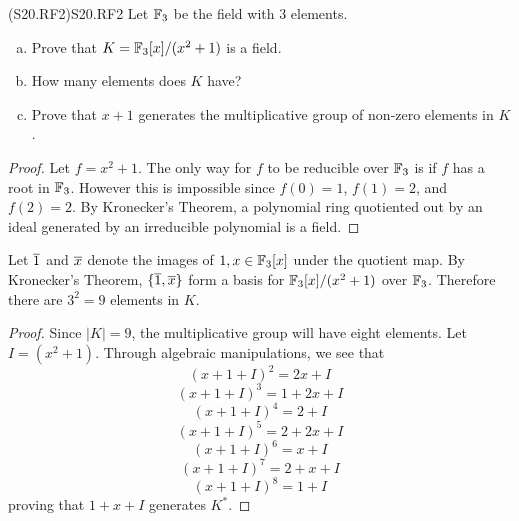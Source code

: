 \documentclass[../AlgebraQualSolutions.tex]{subfiles}
\begin{document}
\begin{prob}{(S20.RF2)}{S20.RF2}
Let $\mathbb{F}_3$ be the field with 3 elements.
\begin{enumerate}[(a)]
\item Prove that $K = \mathbb{F}_3[x]/(x^2 + 1)$ is a field.
\item How many elements does $K$ have?
\item Prove that $x+1$ generates the multiplicative group of non-zero elements in $K$.
\end{enumerate}
\end{prob}

\begin{proof}
	Let $f = x^2 + 1$. The only way for $f$ to be reducible over $\mathbb{F}_3$ is if $f$ has a root in $\mathbb{F}_3$. However this is impossible since $f(0) = 1$, $f(1) = 2$, and $f(2) = 2$. By Kronecker's Theorem, a polynomial ring quotiented out by an ideal generated by an irreducible polynomial is a field.
\end{proof}

\begin{solution}
	Let $\overline{1}$ and $\overline{x}$ denote the images of $1,x \in \mathbb{F}_3[x]$ under the quotient map. By Kronecker's Theorem, $\{\overline{1},\overline{x}\}$ form a basis for $\mathbb{F}_3[x]/(x^2 + 1)$ over $\mathbb{F}_3$. Therefore there are $3^2 = 9$ elements in $K$.
\end{solution}

\begin{proof}
	Since $|K| = 9$, the multiplicative group will have eight elements. Let $I = (x^2 + 1)$. Through algebraic manipulations, we see that 
		\[(x+1+I)^2 = 2x + I\]
		\[(x+1+I)^3 = 1 + 2x + I\]
		\[(x+1+I)^4 = 2 + I\]
		\[(x+1+I)^5 = 2 + 2x + I\]
		\[(x+1+I)^6 = x + I\]
		\[(x+1+I)^7 = 2 + x + I\]
		\[(x+1+I)^8 = 1 + I\]
	proving that $1 + x + I$ generates $K^*$.
\end{proof}
\end{document}
